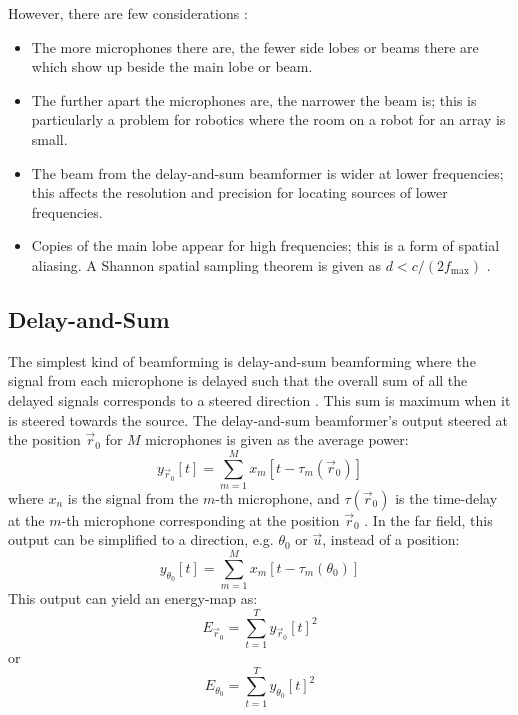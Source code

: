\documentclass[notitlepage]{report}
\begin{document}
However, there are few considerations \cite{argentieri_survey_2015}:
\begin{itemize}
	\item The more microphones there are, the fewer side lobes or beams there are which show up beside the main lobe or beam.
	\item The further apart the microphones are, the narrower the beam is; this is particularly a problem for robotics where the room on a robot for an array is small.
	\item The beam from the delay-and-sum beamformer is wider at lower frequencies; this affects the resolution and precision for locating sources of lower frequencies.
	\item Copies of the main lobe appear for high frequencies; this is a form of spatial aliasing. A Shannon spatial sampling theorem is given as $d<c/(2f_{\text{max}})$ \cite{argentieri_survey_2015}.
\end{itemize}

\subsection{Delay-and-Sum}

The simplest kind of beamforming is delay-and-sum beamforming where the signal from each microphone is delayed such that the overall sum of all the delayed signals corresponds to a steered direction \cite{rascon_localization_2017}. This sum is maximum when it is steered towards the source. The delay-and-sum beamformer's output steered at the position $\vec{r}_0$ for $M$ microphones is given as the average power:
\begin{equation}
y_{\vec{r}_0}[t] = \sum_{m=1}^M x_m[t-\tau_m(\vec{r}_0)] 
\end{equation}
where $x_n$ is the signal from the $m$-th microphone, and $\tau(\vec{r}_0)$ is the time-delay at the $m$-th microphone corresponding at the position $\vec{r}_0$ \cite{argentieri_survey_2015}. In the far field, this output can be simplified to a direction, e.g. $\theta_0$ or $\vec{u}$, instead of a position:
\begin{equation}
y_{\theta_0}[t] = \sum_{m=1}^M x_m[t-\tau_m(\theta_0)] 
\end{equation}
This output can yield an energy-map as:
\begin{equation}
E_{\vec{r}_0} = \sum_{t=1}^T y_{\vec{r}_0}[t]^2
\end{equation}
or
\begin{equation}
E_{\theta_0} = \sum_{t=1}^T y_{\theta_0}[t]^2
\end{equation}
\end{document}

